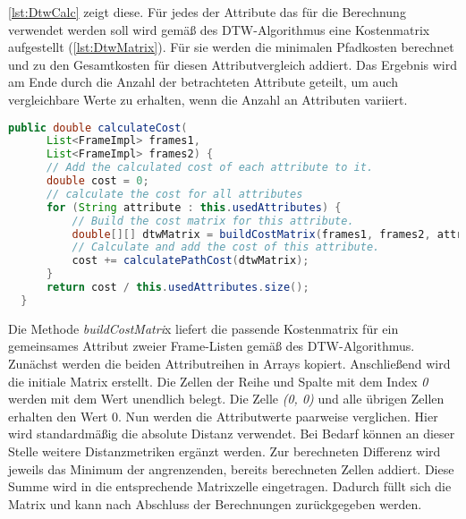 \autoref{lst:DtwCalc} zeigt diese.
Für jedes der Attribute das für die Berechnung verwendet werden soll wird gemäß des \ac{DTW}-Algorithmus
eine Kostenmatrix aufgestellt (\autoref{lst:DtwMatrix}).
Für sie werden die minimalen Pfadkosten berechnet und zu den Gesamtkosten für diesen Attributvergleich addiert.
Das Ergebnis wird am Ende durch die Anzahl der betrachteten Attribute geteilt,
um auch vergleichbare Werte zu erhalten, wenn die Anzahl an Attributen variiert.
\begin{lstfloat}
\begin{lstlisting}[language=Java, label={lst:DtwCalc}, caption=DTW: Berechnung der Kosten.]
  public double calculateCost(
      List<FrameImpl> frames1,
      List<FrameImpl> frames2) {
      // Add the calculated cost of each attribute to it.
      double cost = 0;
      // calculate the cost for all attributes
      for (String attribute : this.usedAttributes) {
          // Build the cost matrix for this attribute.
          double[][] dtwMatrix = buildCostMatrix(frames1, frames2, attribute);
          // Calculate and add the cost of this attribute.
          cost += calculatePathCost(dtwMatrix);
      }
      return cost / this.usedAttributes.size();
  }
\end{lstlisting}
\end{lstfloat}
Die Methode \emph{buildCostMatri}x liefert die passende Kostenmatrix für ein gemeinsames Attribut
zweier Frame-Listen gemäß des \ac{DTW}-Algorithmus.
Zunächst werden die beiden Attributreihen in Arrays kopiert.
Anschließend wird die initiale Matrix erstellt.
Die Zellen der Reihe und Spalte mit dem Index \emph{0} werden mit dem Wert {\glqq unendlich\grqq} belegt.
Die Zelle \emph{(0, 0)} und alle übrigen Zellen erhalten den Wert 0.
Nun werden die Attributwerte paarweise verglichen.
Hier wird standardmäßig die absolute Distanz verwendet.
Bei Bedarf können an dieser Stelle weitere Distanzmetriken ergänzt werden.
Zur berechneten Differenz wird jeweils das Minimum der angrenzenden, bereits berechneten Zellen addiert.
Diese Summe wird in die entsprechende Matrixzelle eingetragen.
Dadurch füllt sich die Matrix und kann nach Abschluss der Berechnungen zurückgegeben werden.
